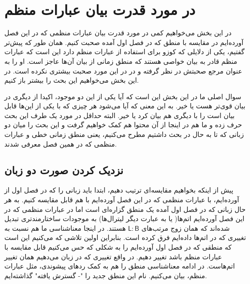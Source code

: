 



















\section{در مورد قدرت بیان عبارات منظم}
در این بخش می‌‌خواهیم کمی در مورد قدرت بیان عبارات منظمی که در این فصل آورده‌ایم در مقایسه با منطق  که در فصل اول آمده صحبت کنیم. همان طور که پیش‌تر گفتیم، یکی از دلایلی که کوزو برای استفاده از عبارات منظم دارد این است که عبارات منظم قادر به بیان خواصی هستند که منطق زمانی از بیان آن‌ها عاجز است. او \cite{regisbetter} را به عنوان مرجع صحبتش در نظر گرفته و در \cite{calcul} در این مورد صحبت بیشتری نکرده است. 
در این بخش می‌خواهیم این بحث را بیشتر باز کنیم. 

سوال اصلی ما در این بخش این است که آیا یکی از این دو موجود، اکیدا از دیگری در بیان قوی‌تر هست یا خیر. به این معنی که آیا می‌شود هر چیزی که با یکی از این‌ها قابل بیان است را با دیگری هم بیان کرد یا خیر. البته \cite{regisbetter} حداقل در مورد یک طرف این بحث حرف زده و ما هم در اینجا از آن محتوا هم کمک خواهیم گرفت و این بحث را میان دو زبانی که تا به حال در بحث داشتیم مطرح می‌کنیم، یعنی منطق زمانی خطی و عبارات منظمی که در همین فصل معرفی شدند.

\subsection{نزدیک کردن صورت دو زبان}

پیش از اینکه بخواهیم مقایسه‌ای ترتیب دهیم، ابتدا باید زبانی را که در فصل اول از  آورده‌ایم، با عبارات منظمی که در این فصل آورده‌ایم با هم قابل مقایسه کنیم. به هر حال زبانی که در فصل اول آمده یک منطق گزاره‌ای است اما در عبارات منظمی که در این فصل آورده‌ایم اتم‌ها( یا به عبارت دیگر لیترال‌ها) به موجودات ساختارمندتری تبدیل شده‌اند که همان زوج مرتب‌های $\mathsf{L:B}$ هستند. در اینجا معناشناسی ما هم نسبت به تغییری که در اتم‌ها داده‌ایم فرق کرده است. بنابراین اولین تلاشی که می‌کنیم این است که منطقی که در فصل اول آورده‌ایم را به شکلی که حس می‌کنیم قابل مقایسه با عبارات منظم باشد تغییر دهیم. در واقع تغییری که در زبان می‌دهیم همان تغییر اتم‌هاست. در ادامه معناشناسی منطق  را هم به کمک ردهای پیشوندی، مثل عبارات منظم، بیان می‌کنیم. نام این منطق جدید را "- گسترش یافته" گذاشته‌ایم. 


